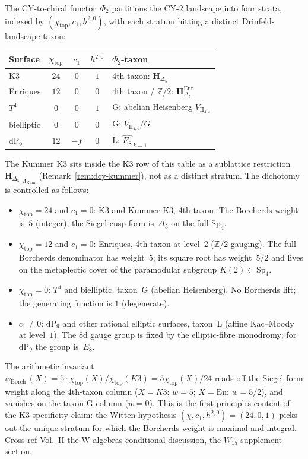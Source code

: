 \begin{remark}
\label{rem:dcy-landscape-partition}
The CY-to-chiral functor~$\Phi_2$ partitions the CY-$2$ landscape
into four strata, indexed by
$(\chi_{\mathrm{top}}, c_1, h^{2,0})$, with each stratum hitting a
distinct Drinfeld-landscape taxon:
\begin{center}
\begin{tabular}{lcccl}
\toprule
Surface & $\chi_{\mathrm{top}}$ & $c_1$ & $h^{2,0}$ & $\Phi_2$-taxon \\
\midrule
K3 & $24$ & $0$ & $1$ & 4th taxon: $\mathbf{H}_{\Delta_5}$ \\
Enriques & $12$ & $0$ & $0$ & 4th taxon / $\mathbb{Z}/2$: $\mathbf{H}_{\Delta_5}^{\mathrm{Enr}}$ \\
$T^4$ & $0$ & $0$ & $1$ & G: abelian Heisenberg $V_{\mathrm{II}_{4,4}}$ \\
bielliptic & $0$ & $0$ & $0$ & G: $V_{\mathrm{II}_{4,4}}/G$ \\
$\mathrm{dP}_9$ & $12$ & $-f$ & $0$ & L: $\widehat{E_8}_{\,k=1}$ \\
\bottomrule
\end{tabular}
\end{center}
The Kummer K3 sits inside the K3 row of this table as a
sublattice restriction
$\mathbf{H}_{\Delta_5}\big|_{\Lambda_{\mathrm{Kum}}}$
(Remark~\ref{rem:dcy-kummer}), not as a distinct
stratum. The dichotomy is controlled as follows:
\begin{itemize}
\item $\chi_{\mathrm{top}} = 24$ and $c_1 = 0$: K3 and Kummer K3,
 4th taxon. The Borcherds weight is~$5$ (integer); the Siegel
 cusp form is~$\Delta_5$ on the full $\mathrm{Sp}_4$.
\item $\chi_{\mathrm{top}} = 12$ and $c_1 = 0$: Enriques, 4th
 taxon at level~$2$ ($\mathbb{Z}/2$-gauging). The full Borcherds
 denominator has weight~$5$; its square root has weight~$5/2$ and
 lives on the metaplectic cover of the paramodular subgroup
 $K(2)\subset\mathrm{Sp}_4$.
\item $\chi_{\mathrm{top}} = 0$: $T^4$ and bielliptic, taxon~G
 (abelian Heisenberg). No Borcherds lift; the generating function
 is $1$ (degenerate).
\item $c_1\ne 0$: $\mathrm{dP}_9$ and other rational elliptic
 surfaces, taxon~L (affine Kac--Moody at level~$1$). The
 $8$d gauge group is fixed by the elliptic-fibre monodromy;
 for~$\mathrm{dP}_9$ the group is~$E_8$.
\end{itemize}
The arithmetic invariant
$w_{\mathrm{Borch}}\,(X) = 5 \cdot \chi_{\mathrm{top}}(X)/\chi_{\mathrm{top}}(K3)
 = 5\chi_{\mathrm{top}}(X)/24$ reads off the Siegel-form weight
along the 4th-taxon column ($X = K3$: $w = 5$; $X = \mathrm{En}$:
$w = 5/2$), and vanishes on the taxon-G column ($w = 0$). This is
the first-principles content of the K3-specificity claim:
the Witten hypothesis $(\chi, c_1, h^{2,0}) = (24, 0, 1)$ picks out
the unique stratum for which the Borcherds weight is maximal and
integral. Cross-ref Vol.~II
the W-algebras-conditional discussion, the $W_{15}$ supplement section.
\end{remark}

